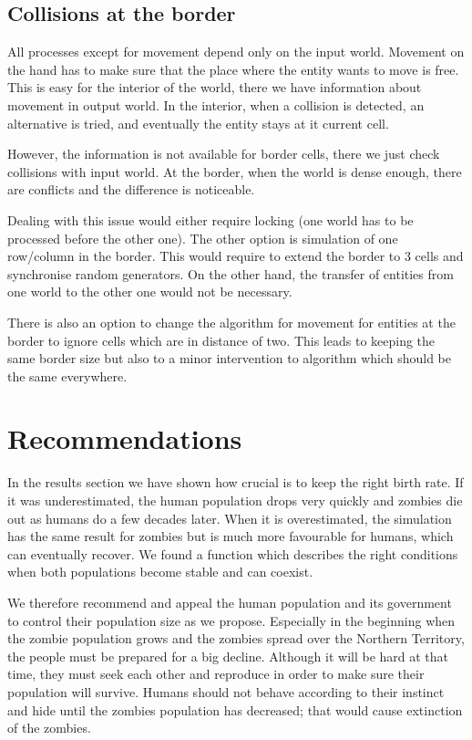 \documentclass[a4paper]{article}
\begin{document}
\subsection{Collisions at the border}

All processes except for movement depend only on the input world.
Movement on the hand has to make sure that the place where the entity wants to move is free.
This is easy for the interior of the world, there we have information about movement in output world.
In the interior, when a collision is detected, an alternative is tried, and eventually the entity stays at it current cell.

However, the information is not available for border cells, there we just check collisions with input world.
At the border, when the world is dense enough, there are conflicts and the difference is noticeable.

Dealing with this issue would either require locking (one world has to be processed before the other one).
The other option is simulation of one row/column in the border.
This would require to extend the border to 3 cells and synchronise random generators.
On the other hand, the transfer of entities from one world to the other one would not be necessary.

There is also an option to change the algorithm for movement for entities at the border to ignore cells which are in distance of two.
This leads to keeping the same border size but also to a minor intervention to algorithm which should be the same everywhere.

\section{Recommendations}

In the results section we have shown how crucial is to keep the right birth rate.
If it was underestimated, the human population drops very quickly and zombies die out as humans do a few decades later.
When it is overestimated, the simulation has the same result for zombies but is much more favourable for humans, which can eventually recover.
We found a function which describes the right conditions when both populations become stable and can coexist.

We therefore recommend and appeal the human population and its government to control their population size as we propose.
Especially in the beginning when the zombie population grows and the zombies spread over the Northern Territory, the people must be prepared for a big decline.
Although it will be hard at that time, they must seek each other and reproduce in order to make sure their population will survive.
Humans should not behave according to their instinct and hide until the zombies population has decreased; that would cause extinction of the zombies.





\begingroup
\raggedright



\endgroup
\end{document}
